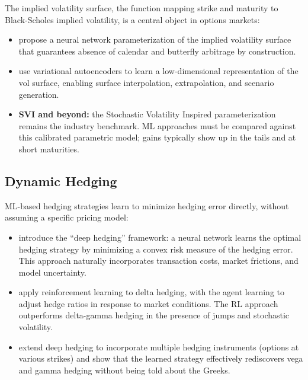The implied volatility surface, the function mapping strike and maturity to Black-Scholes implied volatility, is a central object in options markets:

\begin{itemize}[leftmargin=*]
    \item \citet{Ackerer2020} propose a neural network parameterization of the implied volatility surface that guarantees absence of calendar and butterfly arbitrage by construction.

    \item \citet{Cohen2023} use variational autoencoders to learn a low-dimensional representation of the vol surface, enabling surface interpolation, extrapolation, and scenario generation.

    \item \textbf{SVI and beyond:} the Stochastic Volatility Inspired
    parameterization \citep{Gatheral2014} remains the industry benchmark.
    ML approaches must be compared against this calibrated parametric
    model; gains typically show up in the tails and at short maturities.
\end{itemize}

\subsection{Dynamic Hedging}

ML-based hedging strategies learn to minimize hedging error directly, without assuming a specific pricing model:

\begin{itemize}[leftmargin=*]
    \item \citet{Buehler2019} introduce the ``deep hedging'' framework: a neural network learns the optimal hedging strategy by minimizing a convex risk measure of the hedging error. This approach naturally incorporates transaction costs, market frictions, and model uncertainty.

    \item \citet{Cao2021} apply reinforcement learning to delta hedging, with the agent learning to adjust hedge ratios in response to market conditions. The RL approach outperforms delta-gamma hedging in the presence of jumps and stochastic volatility.

    \item \citet{Murray2022} extend deep hedging to incorporate multiple hedging instruments (options at various strikes) and show that the learned strategy effectively rediscovers vega and gamma hedging without being told about the Greeks.
\end{itemize}

